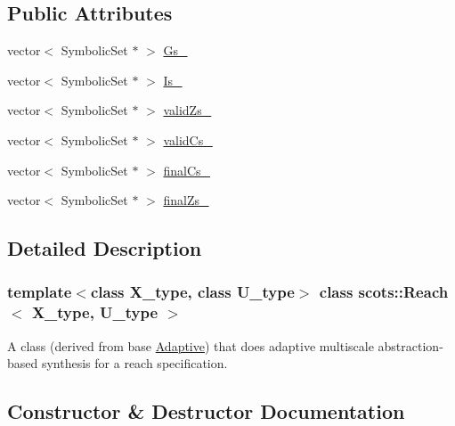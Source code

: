 \subsection*{Public Attributes}
\begin{DoxyCompactItemize}
\item 
vector$<$ Symbolic\+Set $\ast$ $>$ \hyperlink{classscots_1_1Reach_af3fd5ddf192d97ec5dc650ad57e6c485}{Gs\+\_\+}
\item 
vector$<$ Symbolic\+Set $\ast$ $>$ \hyperlink{classscots_1_1Reach_a3366767e4a2edbb8c683e0a74a709b10}{Is\+\_\+}
\item 
vector$<$ Symbolic\+Set $\ast$ $>$ \hyperlink{classscots_1_1Reach_a2f484ac1e7bd5a451b409c373149369c}{valid\+Zs\+\_\+}
\item 
vector$<$ Symbolic\+Set $\ast$ $>$ \hyperlink{classscots_1_1Reach_ade8c2425a8ff0cc7d7ed017412b6aa29}{valid\+Cs\+\_\+}
\item 
vector$<$ Symbolic\+Set $\ast$ $>$ \hyperlink{classscots_1_1Reach_a42e41806d2c3308e41de9b21afae2206}{final\+Cs\+\_\+}
\item 
vector$<$ Symbolic\+Set $\ast$ $>$ \hyperlink{classscots_1_1Reach_ae607710b3da219ec741f8609f870bafd}{final\+Zs\+\_\+}
\end{DoxyCompactItemize}


\subsection{Detailed Description}
\subsubsection*{template$<$class X\+\_\+type, class U\+\_\+type$>$\newline
class scots\+::\+Reach$<$ X\+\_\+type, U\+\_\+type $>$}

A class (derived from base \hyperlink{classscots_1_1Adaptive}{Adaptive}) that does adaptive multiscale abstraction-\/based synthesis for a reach specification. 

\subsection{Constructor \& Destructor Documentation}
\mbox{\label{classscots_1_1Reach_a8da1e1c12f4d050f7006fafddb2c3307}} 

